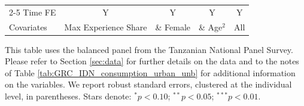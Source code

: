 \begin{table}[htbp]
\begin{threeparttable}
\begin{tabular}{l cccc}
\cmidrule{2-5} Time FE & Y & Y & Y & Y \\ Covariates & Max Experience Share & \& Female & \& Age$^2$ & All \\ \bottomrule \end{tabular} \begin{tablenotes}[flushleft] \footnotesize \item{This table uses the balanced panel from the Tanzanian National Panel Survey. Please refer to Section \ref{sec:data} for further details on the data and to the notes of Table \ref{tab:GRC_IDN_consumption_urban_unb} for additional information on the variables. We report robust standard errors, clustered at the individual level, in parentheses. Stars denote: $^{*} p<0.10$; $^{**} p<0.05$; $^{***} p<0.01$.} \end{tablenotes} \end{threeparttable} \end{table}
